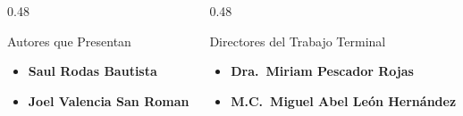 \begin{frame}[t]
  \vspace{2.5mm}
  \begin{columns}[T,onlytextwidth]
    \begin{column}{0.48\textwidth}
      \begin{block}{Autores que Presentan}
        \footnotesize
        \begin{itemize}\setlength{\itemsep}{2pt}
          \item \textbf{Saul Rodas Bautista}
          \item \textbf{Joel Valencia San Roman}
        \end{itemize}
      \end{block}
    \end{column}
    \begin{column}{0.48\textwidth}
      \begin{block}{Directores del Trabajo Terminal}
        \footnotesize
        \begin{itemize}\setlength{\itemsep}{2pt}
          \item \textbf{Dra.\ Miriam Pescador Rojas}
          \item \textbf{M.C.\ Miguel Abel Le\'on Hern\'andez}
        \end{itemize}
      \end{block}
    \end{column}
  \end{columns}
\end{frame}


